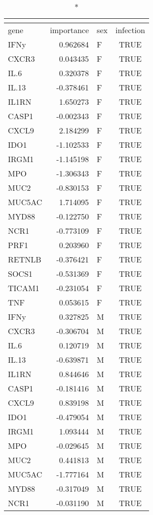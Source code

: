 \begin{longtable}{lrlc}
\caption*{
{\large }
} \\ 
\toprule
gene & importance & sex & infection \\ 
\midrule\addlinespace[2.5pt]
IFNy & 0.962684 & F & TRUE \\ 
CXCR3 & 0.043435 & F & TRUE \\ 
IL.6 & 0.320378 & F & TRUE \\ 
IL.13 & -0.378461 & F & TRUE \\ 
IL1RN & 1.650273 & F & TRUE \\ 
CASP1 & -0.002343 & F & TRUE \\ 
CXCL9 & 2.184299 & F & TRUE \\ 
IDO1 & -1.102533 & F & TRUE \\ 
IRGM1 & -1.145198 & F & TRUE \\ 
MPO & -1.306343 & F & TRUE \\ 
MUC2 & -0.830153 & F & TRUE \\ 
MUC5AC & 1.714095 & F & TRUE \\ 
MYD88 & -0.122750 & F & TRUE \\ 
NCR1 & -0.773109 & F & TRUE \\ 
PRF1 & 0.203960 & F & TRUE \\ 
RETNLB & -0.376421 & F & TRUE \\ 
SOCS1 & -0.531369 & F & TRUE \\ 
TICAM1 & -0.231054 & F & TRUE \\ 
TNF & 0.053615 & F & TRUE \\ 
IFNy & 0.327825 & M & TRUE \\ 
CXCR3 & -0.306704 & M & TRUE \\ 
IL.6 & 0.120719 & M & TRUE \\ 
IL.13 & -0.639871 & M & TRUE \\ 
IL1RN & 0.844646 & M & TRUE \\ 
CASP1 & -0.181416 & M & TRUE \\ 
CXCL9 & 0.839198 & M & TRUE \\ 
IDO1 & -0.479054 & M & TRUE \\ 
IRGM1 & 1.093444 & M & TRUE \\ 
MPO & -0.029645 & M & TRUE \\ 
MUC2 & 0.441813 & M & TRUE \\ 
MUC5AC & -1.777164 & M & TRUE \\ 
MYD88 & -0.317049 & M & TRUE \\ 
NCR1 & -0.031190 & M & TRUE \\ 

\end{longtable}
